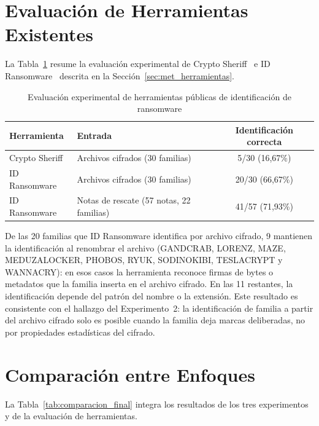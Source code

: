 \section{Evaluación de Herramientas Existentes}
\label{sec:res_herramientas}

La Tabla~\ref{tab:herramientas} resume la evaluación experimental de Crypto Sheriff~\cite{cryptosheriff} e ID Ransomware~\cite{idransomware} descrita en la Sección~\ref{sec:met_herramientas}.

\begin{table}[ht]
\centering
\caption{Evaluación experimental de herramientas públicas de identificación de ransomware}
\label{tab:herramientas}
\begin{tabular}{|l|l|c|}
\hline
\textbf{Herramienta} & \textbf{Entrada} & \textbf{Identificación correcta} \\
\hline
Crypto Sheriff & Archivos cifrados (30 familias) & 5/30 (16,67\%) \\
ID Ransomware & Archivos cifrados (30 familias) & 20/30 (66,67\%) \\
ID Ransomware & Notas de rescate (57 notas, 22 familias) & 41/57 (71,93\%) \\
\hline
\end{tabular}
\end{table}

De las 20 familias que ID Ransomware identifica por archivo cifrado, 9 mantienen la identificación al renombrar el archivo (GANDCRAB, LORENZ, MAZE, MEDUZALOCKER, PHOBOS, RYUK, SODINOKIBI, TESLACRYPT y WANNACRY): en esos casos la herramienta reconoce firmas de bytes o metadatos que la familia inserta en el archivo cifrado. En las 11 restantes, la identificación depende del patrón del nombre o la extensión. Este resultado es consistente con el hallazgo del Experimento~2: la identificación de familia a partir del archivo cifrado solo es posible cuando la familia deja marcas deliberadas, no por propiedades estadísticas del cifrado.

\section{Comparación entre Enfoques}

La Tabla~\ref{tab:comparacion_final} integra los resultados de los tres experimentos y de la evaluación de herramientas.

